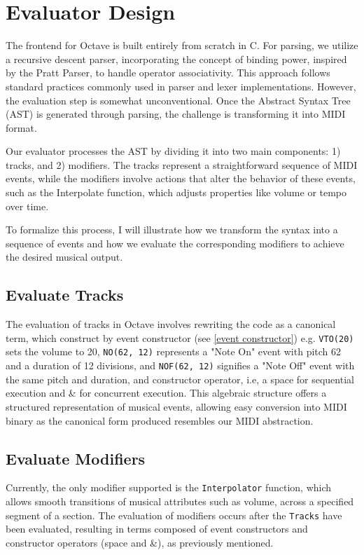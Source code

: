 \documentclass[letterpaper,12pt]{article}
\begin{document}
\section{Evaluator Design}
The frontend for Octave is built entirely from scratch in C. For parsing, we utilize a recursive descent parser, incorporating the concept of binding power, inspired by the Pratt Parser, to handle operator associativity. This approach follows standard practices commonly used in parser and lexer implementations. However, the evaluation step is somewhat unconventional. Once the Abstract Syntax Tree (AST) is generated through parsing, the challenge is transforming it into MIDI format.

Our evaluator processes the AST by dividing it into two main components: 1) tracks, and 2) modifiers. The tracks represent a straightforward sequence of MIDI events, while the modifiers involve actions that alter the behavior of these events, such as the Interpolate function, which adjusts properties like volume or tempo over time.

To formalize this process, I will illustrate how we transform the syntax into a sequence of events and how we evaluate the corresponding modifiers to achieve the desired musical output.

\subsection{Evaluate Tracks}
The evaluation of tracks in Octave involves rewriting the code as a canonical term,
 which construct by event constructor (see \ref{event constructor}) e.g. \texttt{VTO(20)} sets the volume to 20, \texttt{NO(62, 12)} 
represents a "Note On" event with pitch 62 and a duration of 12 divisions, and \texttt{NOF(62, 12)} signifies 
a "Note Off" event with the same pitch and duration, and constructor operator, i.e, a space 
for sequential execution and \& for concurrent execution. This algebraic structure offers a structured 
representation of musical events, allowing easy conversion into MIDI binary as the canonical form produced 
resembles our MIDI abstraction.

\subsection{Evaluate Modifiers}
Currently, the only modifier supported is the \texttt{Interpolator} function, which allows smooth transitions of musical attributes such as volume, across a specified segment of a section. The evaluation of modifiers occurs after the \texttt{Tracks} have been 
evaluated, resulting in terms composed of event constructors and constructor operators (space and \&), as 
previously mentioned.
\end{document}
